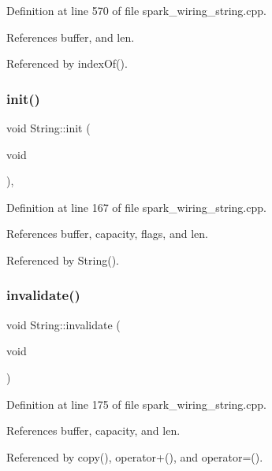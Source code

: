 Definition at line 570 of file spark\+\_\+wiring\+\_\+string.\+cpp.



References buffer, and len.



Referenced by index\+Of().

\mbox{\label{class_string_af597f6dc5a6a96d14d5409b48254b8fb}} 
\subsubsection{\texorpdfstring{init()}{init()}}
{\footnotesize\ttfamily void String\+::init (\begin{DoxyParamCaption}\item[{void}]{ }\end{DoxyParamCaption})\hspace{0.3cm}{\ttfamily [inline]}, {\ttfamily [protected]}}



Definition at line 167 of file spark\+\_\+wiring\+\_\+string.\+cpp.



References buffer, capacity, flags, and len.



Referenced by String().

\mbox{\label{class_string_a9bee9137075d66b2af742969cb7549d9}} 
\subsubsection{\texorpdfstring{invalidate()}{invalidate()}}
{\footnotesize\ttfamily void String\+::invalidate (\begin{DoxyParamCaption}\item[{void}]{ }\end{DoxyParamCaption})\hspace{0.3cm}{\ttfamily [protected]}}



Definition at line 175 of file spark\+\_\+wiring\+\_\+string.\+cpp.



References buffer, capacity, and len.



Referenced by copy(), operator+(), and operator=().

